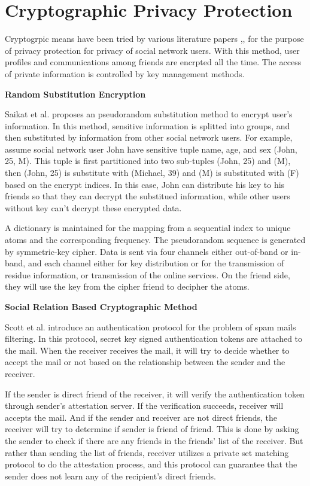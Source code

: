 \documentclass[12pt]{article}
\begin{document}
\section{Cryptographic Privacy Protection \label{sec:crypto}}
Cryptogrpic means have been tried by various literature papers
\cite{noyb},\cite{reliable_email},\cite{group-deanonymization-attack}
for the purpose of privacy protection for privacy of social network
users. With this method, user profiles and communications among
friends are encrpted all the time. The access of private information
is controlled by key management methods. 

\textbf{Random Substitution Encryption}

Saikat et al.\cite{noyb} proposes an pseudorandom substitution method
to encrypt user's information. In this method, sensitive information
is splitted into groups, and then substituted by information from
other social network users. For example, assume social network user
John have sensitive tuple name, age, and sex (John, 25, M). This tuple
is first partitioned into two sub-tuples (John, 25) and (M), then
(John, 25) is substitute with (Michael, 39) and (M) is substituted
with (F) based on the encrypt indices. In this case, John can
distribute his key to his friends so that they can decrypt the
substitued information, while other users without key can't decrypt
these encrypted data. 

A dictionary is maintained for the mapping from a sequential index to
unique atoms and the corresponding frequency. The pseudorandom
sequence is generated by symmetric-key cipher. Data is sent via four
channels either out-of-band or in-band, and each channel either for
key distribution or for the transmission of residue information, or
transmission of the online services. On the friend side, they will use
the key from the cipher friend to decipher the atoms. 

\textbf{Social Relation Based Cryptographic Method}

Scott et al.\cite{reliable_email} introduce an authentication
protocol for the problem of spam mails filtering. In this protocol,
secret key signed authentication tokens are attached to the mail. When
the receiver receives the mail, it will try to decide whether to
accept the mail or not based on the relationship between the sender
and the receiver. 

If the sender is direct friend of the receiver, it will verify the
authentication token through sender's attestation server. If the
verification succeeds, receiver will accepts the mail. And if the
sender and receiver are not direct friends, the receiver will try to
determine if sender is friend of friend. This is done by asking the
sender to check if there are any friends in the friends' list of the
receiver. But rather than sending the list of friends, receiver utilizes a
private set matching protocol to do the attestation process, and this
protocol can guarantee that the sender does not learn any of the
recipient's direct friends. 
\end{document}
